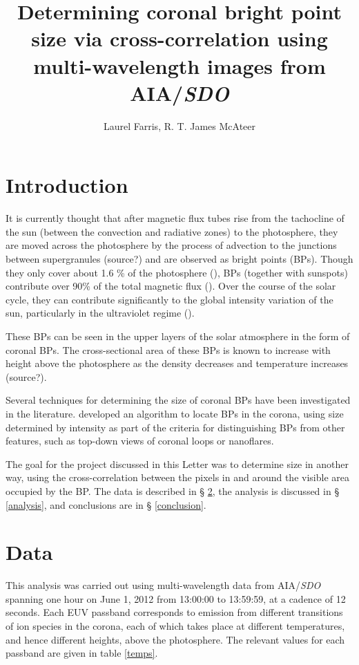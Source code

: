 \documentclass[preprint2]{aastex}
\begin{document}
\title{Determining coronal bright point size via cross-correlation using
multi-wavelength images from AIA/\textit{SDO}}
\author{Laurel Farris, R. T. James McAteer}

\begin{abstract}
\end{abstract}

\section{Introduction}\label{intro}
It is currently thought that after magnetic flux tubes rise from the tachocline
of the sun (between the convection and radiative zones) to the photosphere, they
are moved across the photosphere by the process of advection to the junctions
between supergranules (source?) and are observed as bright points (BPs).
Though they only cover about 1.6 \% of the
photosphere (\cite{Srivastava}), BPs (together with sunspots)
contribute over 90\% of the total magnetic flux (\cite{Howard}).
Over the course of the solar cycle, they can contribute significantly to the
global intensity variation of the sun, particularly in the ultraviolet
regime (\cite{Riethmuller}).

These BPs can be seen in the upper layers of the solar atmosphere in the form
of coronal BPs. The cross-sectional area of these BPs is known to increase with
height above the photosphere as the density decreases and temperature increases
(source?).

Several techniques for determining the size of coronal BPs have been investigated
in the literature.
\cite{Alipour} developed an algorithm to locate BPs in the corona, using size determined
by intensity as part of the criteria for distinguishing BPs from other features,
such as top-down views of coronal loops or nanoflares.

The goal for the project discussed in this Letter was to determine size in another
way, using the cross-correlation between the pixels in and around the visible
area occupied by the BP. The data is described in \S{} \ref{data},
the analysis is discussed in \S{} \ref{analysis},
and conclusions are in \S{} \ref{conclusion}.


\section{Data}\label{data}
This analysis was carried out using multi-wavelength data from AIA/\textit{SDO}
spanning one hour on June 1, 2012 from 13:00:00 to 13:59:59, at a cadence of 12
seconds.
Each EUV passband corresponds to emission
from different transitions of ion species in the corona, each of which takes
place at different temperatures, and hence different heights, above the
photosphere.
The relevant values for each passband are given in table \ref{temps}.
\end{document}
